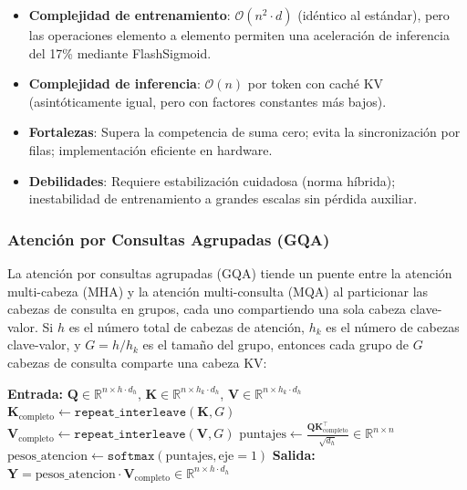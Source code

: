 \begin{itemize}[leftmargin=*]
    \item \textbf{Complejidad de entrenamiento}: $\mathcal{O}(n^2 \cdot d)$ (idéntico al estándar), pero las operaciones elemento a elemento permiten una aceleración de inferencia del 17\% mediante FlashSigmoid.
    \item \textbf{Complejidad de inferencia}: $\mathcal{O}(n)$ por token con caché KV (asintóticamente igual, pero con factores constantes más bajos).
    \item \textbf{Fortalezas}: Supera la competencia de suma cero; evita la sincronización por filas; implementación eficiente en hardware.
    \item \textbf{Debilidades}: Requiere estabilización cuidadosa (norma híbrida); inestabilidad de entrenamiento a grandes escalas sin pérdida auxiliar.
\end{itemize}

\subsubsection{Atención por Consultas Agrupadas (GQA)}
La atención por consultas agrupadas (GQA) \citep{ainslie_gqa_2023} tiende un puente entre la atención multi-cabeza (MHA) y la atención multi-consulta (MQA) al particionar las cabezas de consulta en grupos, cada uno compartiendo una sola cabeza clave-valor. Si $h$ es el número total de cabezas de atención, $h_k$ es el número de cabezas clave-valor, y $G = h / h_k$ es el tamaño del grupo, entonces cada grupo de $G$ cabezas de consulta comparte una cabeza KV:

\begin{algorithmic}[1]
\State \textbf{Entrada:} $\mathbf{Q} \in \mathbb{R}^{n \times h \cdot d_h}$, $\mathbf{K} \in \mathbb{R}^{n \times h_k \cdot d_h}$, $\mathbf{V} \in \mathbb{R}^{n \times h_k \cdot d_h}$
\State $\mathbf{K}_{\text{completo}} \gets \texttt{repeat\_interleave}(\mathbf{K}, G)$ 
\State $\mathbf{V}_{\text{completo}} \gets \texttt{repeat\_interleave}(\mathbf{V}, G)$
\State $\text{puntajes} \gets \frac{\mathbf{Q}\mathbf{K}_{\text{completo}}^\top}{\sqrt{d_h}} \in \mathbb{R}^{n \times n}$ 
\State $\text{pesos\_atencion} \gets \texttt{softmax}(\text{puntajes}, \text{eje}=1)$
\State \textbf{Salida:} $\mathbf{Y} = \text{pesos\_atencion} \cdot \mathbf{V}_{\text{completo}} \in \mathbb{R}^{n \times h \cdot d_h}$
\end{algorithmic}

